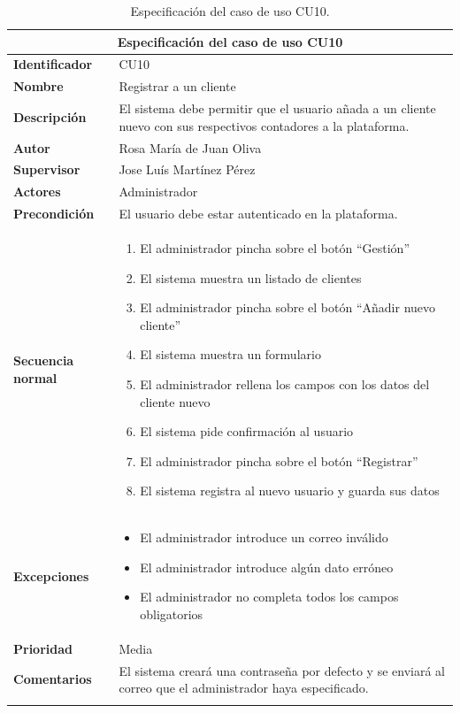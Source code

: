 \documentclass[pdftex,11pt,a4paper]{book}
\begin{document}
\begin{center}
\begin{longtable}{|m{}|m{11cm}|}
\hline
\multicolumn{2}{|c|}{\textbf{Especificación del caso de uso CU10}}\\
\hline 
\endhead

\textbf{Identificador} & CU10  
\\ \hline
\textbf{Nombre} & Registrar a un cliente 
\\ \hline
\textbf{Descripción} & El sistema debe permitir que el usuario añada a un cliente nuevo con sus respectivos contadores a la plataforma.
\\ \hline
\textbf{Autor} & Rosa María de Juan Oliva 
\\ \hline
\textbf{Supervisor} & Jose Luís Martínez Pérez  
\\ \hline
\textbf{Actores} & Administrador 
\\ \hline
\textbf{Precondición} & El usuario debe estar autenticado en la plataforma.
\\ \hline
\textbf{Secuencia normal} & 
\begin{enumerate}
\addtolength{\itemsep}{-3mm}
\item El administrador pincha sobre el botón “Gestión”
\item El sistema muestra un listado de clientes
\item El administrador pincha sobre el botón “Añadir nuevo cliente”
\item El sistema muestra un formulario
\item El administrador rellena los campos con los datos del cliente nuevo
\item El sistema pide confirmación al usuario
\item El administrador pincha sobre el botón “Registrar”
\item El sistema registra al nuevo usuario y guarda sus datos
\end{enumerate}
\\ \hline
\textbf{Excepciones} &
\begin{itemize}
\addtolength{\itemsep}{-3mm}
\item El administrador introduce un correo inválido
\item El administrador introduce algún dato erróneo
\item El administrador no completa todos los campos obligatorios
\end{itemize}
\\ \hline
\textbf{Prioridad} & Media
\\ \hline
\textbf{Comentarios} & El sistema creará una contraseña por defecto y se enviará al correo que el administrador haya especificado. 
\\ \hline

\caption{Especificación del caso de uso CU10.} \label{tablalarga:tablaCU10}
\end{longtable}
\end{center}
\end{document}
